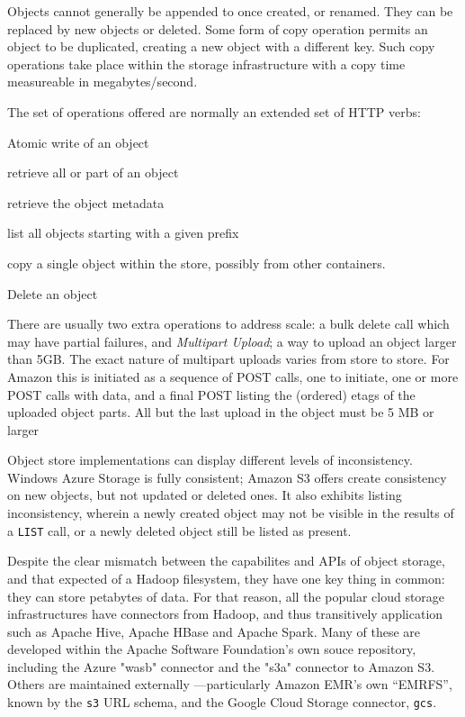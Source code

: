 \documentclass[conference]{IEEEtran}
\begin{document}
Objects cannot generally be appended to once created, or renamed.
They can be replaced by new objects or deleted.
Some form of copy operation permits an object to be duplicated, creating
a new object with a different key.
Such copy operations take place within the storage infrastructure with a
copy time measureable in megabytes/second.


The set of operations offered are normally an extended set of HTTP verbs:

\begin{description}[leftmargin=8em, style=nextline]
  \item[PUT] Atomic write of an object
  \item[GET] retrieve all or part of an object
  \item[HEAD] retrieve the object metadata
  \item[LIST] list all objects starting with a given prefix
  \item[COPY] copy a single object within the store, possibly from other containers.
  \item[DELETE] Delete an object
\end{description}

There are usually two extra operations to address scale:
 a bulk delete call which may have partial failures,
and \emph{Multipart Upload}; a way to upload an object larger than 5GB\@.
The exact nature of multipart uploads varies from store to store.
For Amazon this is initiated as a sequence of POST calls, one to initiate,
one or more POST calls with data, and a final POST listing the (ordered)
etags of the uploaded object parts.
All but the last upload in the object must be 5 MB or larger


Object store implementations can display different levels of inconsistency.
Windows Azure Storage is fully consistent;
Amazon S3 offers create consistency on new objects, but not updated or deleted ones.
It also exhibits listing inconsistency, wherein a newly created object
may not be visible in the results of a \texttt{LIST} call, or a newly deleted
object still be listed as present.


Despite the clear mismatch between the capabilites and APIs of object storage,
and that expected of a Hadoop filesystem, they have one key thing in common:
they can store petabytes of data.
For that reason, all the popular cloud storage infrastructures have connectors
from Hadoop, and thus transitively application such as Apache Hive, Apache HBase
and Apache Spark.
Many of these are developed within the Apache Software Foundation's own
souce repository, including the Azure "wasb" connector and the "s3a" connector
to Amazon S3.
Others are maintained externally ---particularly Amazon EMR's own ``EMRFS'',
known by the \texttt{s3} URL schema, and the Google Cloud Storage connector,
\texttt{gcs}.
\end{document}
